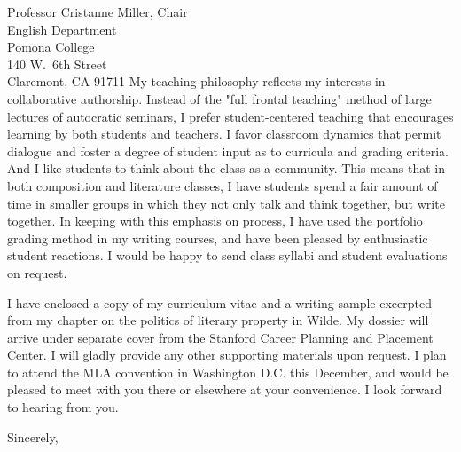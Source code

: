 \documentclass[11pt,draft]{mtletter}
\begin{document}
\begin{letter}{%
Professor Cristanne Miller, Chair \\
English Department \\
Pomona College \\
140 W.~6th Street \\
Claremont, CA 91711
}
My teaching philosophy reflects my interests in collaborative authorship. Instead of the "full frontal teaching" method of large lectures of autocratic seminars, I prefer student-centered teaching that encourages learning by both students and teachers. I favor classroom dynamics that permit dialogue and foster a degree of student input as to curricula and grading criteria. And I like students to think about the class as a community. This means that in both composition and literature classes, I have students spend a fair amount of time in smaller groups in which they not only talk and think together, but write together. In keeping with this emphasis on process, I have used the portfolio grading method in my writing courses, and have been pleased by enthusiastic student reactions. I would be happy to send class syllabi and student evaluations on request.

I have enclosed a copy of my curriculum vitae and a writing sample excerpted from my chapter on the politics of literary property in Wilde. My dossier will arrive under separate cover from the Stanford Career Planning and Placement Center. I will gladly provide any other supporting materials upon request. I plan to attend the MLA convention in Washington D.C. this December, and would be pleased to meet with you there or elsewhere at your convenience. I look forward to hearing from you.

 
\closing{Sincerely,}

 
\end{letter}
\end{document}

